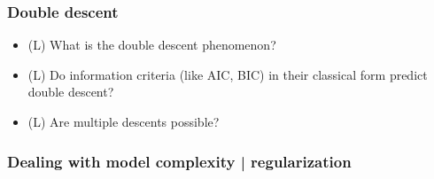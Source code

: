 \subsubsection*{Double descent}
\begin{itemize}
    \item (L) What is the double descent phenomenon?
    \answerboxM
    \item (L) Do information criteria (like AIC, BIC) in their classical form predict double descent?
    \answerboxM
    \item (L) Are multiple descents possible?
    \answerboxS
\end{itemize}

\subsubsection*{Dealing with model complexity | regularization}
